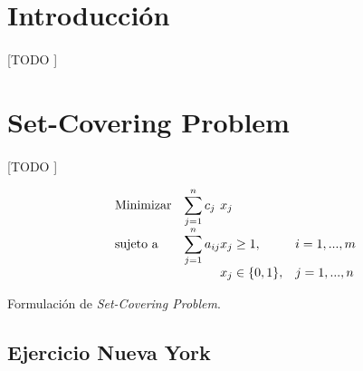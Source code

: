 \documentclass[spanish]{article}
\begin{document}
	\maketitle %

	\thispagestyle{fancy} %



	\begin{abstract}
		\noindent [TODO ]
	\end{abstract}


	\section{Introducción}

		\paragraph{}
		[TODO ]

	\setcounter{section}{5}

	\section{Set-Covering Problem}
	\label{sec:e-6}

		\paragraph{}
		[TODO ]

		\begin{eqfloat}
			\begin{equation}
				\begin{array}{ll@{}ll}
					\text{Minimizar}	& \displaystyle\sum\limits_{j=1}^{n} c_{j}	&	x_{j} &\\
					\text{sujeto a}		& \displaystyle\sum\limits_{j = 1}^n a_{ij}	&	x_{j} \geq 1,  &i=1 ,..., m\\
														&                                           &	x_{j} \in \{0,1\}, &j=1 ,..., n
				\end{array}
			\end{equation}
			\caption{Formulación de \emph{Set-Covering Problem}.}
			\label{eq:set_covering}
		\end{eqfloat}


		\subsection{Ejercicio Nueva York}
		\label{sec:e-6.1}
\end{document}
